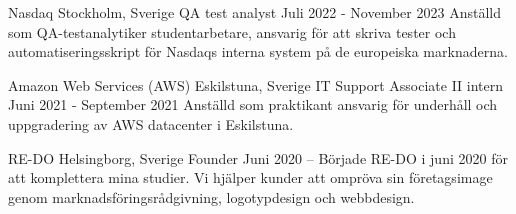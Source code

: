 \documentclass[../main.tex]{subfiles}
\begin{document}
\company
    {Nasdaq}
    {Stockholm, Sverige}
\titles
    {QA test analyst}
    {Juli 2022 - November 2023}
    {Anställd som QA-testanalytiker studentarbetare, ansvarig för att skriva tester och automatiseringsskript för Nasdaqs interna system på de europeiska marknaderna.}

\company
    {Amazon Web Services (AWS)}
    {Eskilstuna, Sverige}
\titles
    {IT Support Associate II intern}
    {Juni 2021 - September 2021}
    {Anställd som praktikant ansvarig för underhåll och uppgradering av AWS datacenter i Eskilstuna.}

\company
    {RE-DO}
    {Helsingborg, Sverige}
\titles
    {Founder}
    {Juni 2020 –} 
    {Började RE-DO i juni 2020 för att komplettera mina studier. Vi hjälper kunder att ompröva sin företagsimage genom marknadsföringsrådgivning, logotypdesign och webbdesign.}
\end{document}
